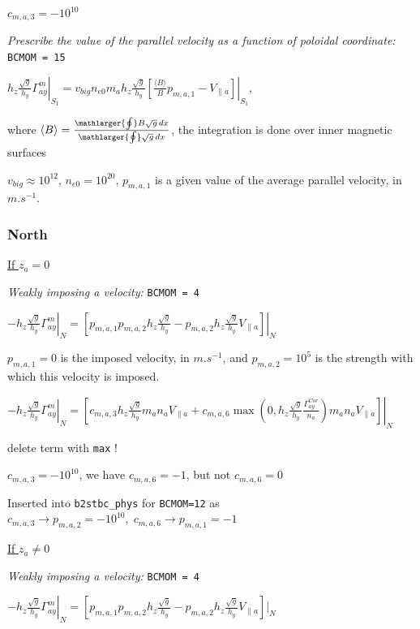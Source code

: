 \documentclass[a4paper,10pt]{report}
\begin{document}
$c_{m,a,3} = -10^{10}$

{\em Prescribe the value of the parallel velocity as a function of poloidal coordinate:} {\tt BCMOM = 15}

$
\left. h_z \frac{\sqrt g}{h_y} \Gamma_{ay}^m \right|_{S_1} =
\left. v_{big} n_{e0} m_{a} h_z \frac{\sqrt g}{h_y} \left[
	\frac{\langle B \rangle}{B} p_{m,a,1} - V_{\parallel a}
\right] \right|_{S_1}$,

where  $\langle B \rangle =
\frac{\mathlarger{\oint} B \sqrt{g} \, dx}{\mathlarger{\oint} \sqrt{g} \, dx}
$, the integration is done over inner magnetic surfaces

$v_{big} \approx 10^{12}$, $n_{e0} = 10^{20}$, $p_{m,a,1}$ is a given value of the average parallel velocity, in $m.s^{-1}$.

\subsubsection{North}

\underline{If $z_a=0$}

{\em Weakly imposing a velocity:} {\tt BCMOM = 4}

$ \left. -h_z \frac{\sqrt g}{h_y} \Gamma_{ay}^m \right|_N = \left. \left[
	p_{m,a,1} p_{m,a,2} h_z \frac{\sqrt g}{h_y} -
	p_{m,a,2} h_z \frac{\sqrt g}{h_y} V_{\parallel a}\right]
\right|_N$

$p_{m,a,1}=0$ is the imposed velocity, in $m.s^{-1}$, and $p_{m,a,2}=10^5$ is the strength with which this velocity is imposed.

$\left. -h_z \frac{\sqrt g}{h_y} \Gamma_{ay}^m \right|_N = \left. \left[
	c_{m,a,3} h_z \frac{\sqrt g}{h_y} m_a n_a V_{\parallel a} +
	c_{m,a,6} \max \left(
		0, h_z \frac{\sqrt g}{h_y} \frac{\Gamma_{ay}^{Cor}}{n_a}
	\right) m_a n_a V_{\parallel a}
\right]
\right|_N$

delete term with {\tt max} !

$c_{m,a,3} = -10^{10}$, we have  $c_{m,a,6} = -1$, but not $c_{m,a,6} = 0$

Inserted into {\tt b2stbc\_phys} for {\tt BCMOM=12} as $c_{m,a,3} \rightarrow p_{m,a,2} = -10^{10},\;c_{m,a,6} \rightarrow
p_{m,a,1} = -1$

\underline{If $z_a \neq 0$}


{\em Weakly imposing a velocity:} {\tt BCMOM = 4}

$ \left. -h_z \frac{\sqrt g}{h_y} \Gamma_{ay}^m \right|_N = \left[
	p_{m,a,1} p_{m,a,2} h_z \frac{\sqrt g}{h_y} -
	p_{m,a,2} h_z \frac{\sqrt g}{h_y} V_{\parallel a}
\right]|_N$
\end{document}
